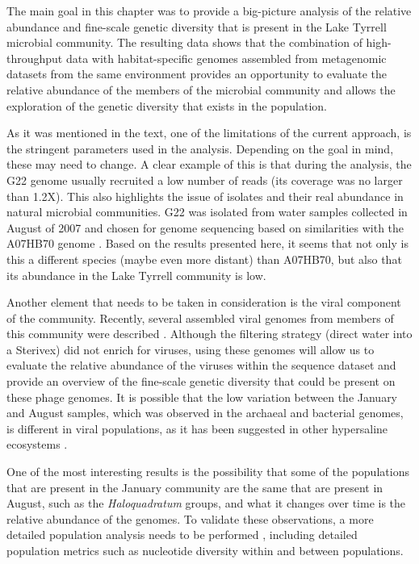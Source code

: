 The main goal in this chapter was to provide a big-picture analysis of the relative abundance and fine-scale genetic diversity that is present in the Lake Tyrrell microbial community. The resulting data shows that the combination of high-throughput data with habitat-specific genomes assembled from metagenomic datasets from the same environment \cite{Narasingarao:2012kp,Podell:2013kx,Podell:2013fp} provides an opportunity to evaluate the relative abundance of the members of the microbial community and allows the exploration of the genetic diversity that exists in the population.

As it was mentioned in the text, one of the limitations of the current approach, is the stringent parameters used in the analysis. Depending on the goal in mind, these may need to change. A clear example of this is that during the analysis, the G22 genome usually recruited a low number of reads (its coverage was no larger than 1.2X). This also highlights the issue of isolates and their real abundance in natural microbial communities. G22 was isolated from water samples collected in August of 2007 and chosen for genome sequencing based on similarities with the A07HB70 genome \cite{Ugalde:2013hb}. Based on the results presented here, it seems that not only  is this a different species (maybe even more distant) than A07HB70, but also that its abundance in the Lake Tyrrell community is low.

Another element that needs to be taken in consideration is the viral component of the community. Recently, several assembled viral genomes from members of this community were described \cite{Emerson:2012gh,Emerson:2013ck}. Although the filtering strategy (direct water into a Sterivex) did not enrich for viruses, using these genomes will allow us to evaluate the relative abundance of the viruses within the sequence dataset and provide an overview of the fine-scale genetic diversity that could be present on these phage genomes. It is possible that the low variation between the January and August samples, which was observed in the archaeal and bacterial genomes, is different in viral populations, as it has been suggested in other hypersaline ecosystems \cite{RodriguezBrito:2010in}.

One of the most interesting results is the possibility that some of the populations that are present in the January community are the same that are present in August, such as the \textit{Haloquadratum} groups, and what it changes over time is the relative abundance of the genomes. To validate these observations, a more detailed population analysis needs to be performed \cite{Schloissnig:2012hx,Kryazhimskiy:2008hq,Whitaker:2006gf}, including detailed population metrics such as nucleotide diversity within and between populations.

